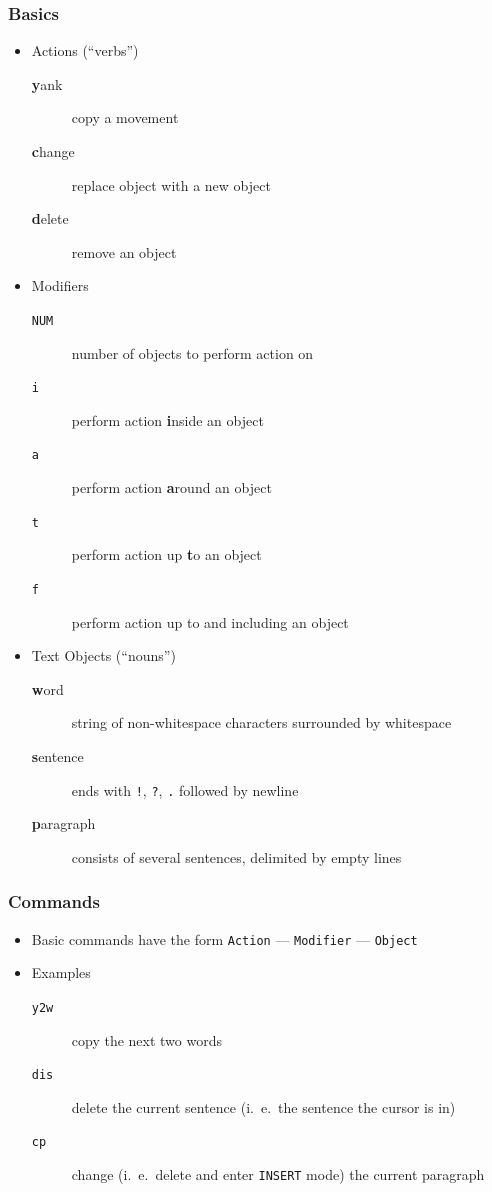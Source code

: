 \documentclass{beamer}
\begin{document}
\begin{frame}
    \frametitle{Basics}
    \begin{itemize}
        \item Actions (``verbs'')
        \begin{description}
            \item [\textbf{y}ank]   copy a movement
            \item [\textbf{c}hange] replace object with a new object
            \item [\textbf{d}elete] remove an object
        \end{description}
        \item Modifiers
        \begin{description}
            \item [\texttt{NUM}] number of objects to perform action on
            \item [\texttt{i}]   perform action \textbf{i}nside an object
            \item [\texttt{a}]   perform action \textbf{a}round an object
            \item [\texttt{t}]   perform action up \textbf{t}o an object
            \item [\texttt{f}]   perform action up to and including an object
        \end{description}
        \item Text Objects (``nouns'')
        \begin{description}
            \item [\textbf{w}ord]      string of non-whitespace characters surrounded by whitespace
            \item [\textbf{s}entence]  ends with \texttt{!}, \texttt{?}, \texttt{.} followed by newline
            \item [\textbf{p}aragraph] consists of several sentences, delimited by empty lines
        \end{description}
    \end{itemize}
\end{frame}
\begin{frame}
    \frametitle{Commands}
    \begin{itemize}
        \item Basic commands have the form \texttt{Action} --- \texttt{Modifier} --- \texttt{Object}
        \item Examples
        \begin{description}
            \item [\texttt{y2w}] copy the next two words
            \item [\texttt{dis}] delete the current sentence (i.\ e.\ the sentence the cursor is in)
            \item [\texttt{cp}]  change (i.\ e.\ delete and enter \texttt{INSERT} mode) the current paragraph
        \end{description}
    \end{itemize}
\end{frame}
\end{document}

